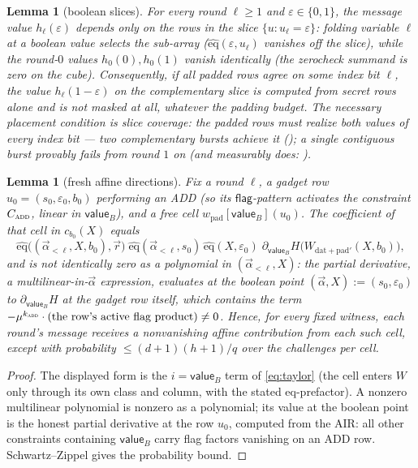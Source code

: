 \documentclass{article}
\newcommand{\eqf}{\widehat{\mathrm{eq}}}
\newcommand{\dat}{\mathrm{dat}}
\newcommand{\pad}{\mathrm{pad}}
\newtheorem{lemma}[theorem]{Lemma}
\theoremstyle{definition}
\begin{document}
\begin{lemma}[boolean slices]\label{lem:slices}
For every round $\ell \geq 1$ and $\varepsilon \in \{0,1\}$, the message value $h_\ell(\varepsilon)$ depends only on the rows in the slice $\{u : u_\ell = \varepsilon\}$: folding variable $\ell$ at a boolean value selects the sub-array ($\eqf(\varepsilon, u_\ell)$ vanishes off the slice), while the round-$0$ values $h_0(0), h_0(1)$ vanish identically (the zerocheck summand is zero on the cube). Consequently, if all padded rows agree on some index bit $\ell$, the value $h_\ell(1 - \varepsilon)$ on the complementary slice is computed from secret rows alone and is \emph{not masked at all}, whatever the padding budget. The necessary placement condition is \emph{slice coverage}: the padded rows must realize both values of every index bit --- two complementary bursts achieve it (); a single contiguous burst provably fails from round $1$ on (and measurably does: ).
\end{lemma}

\begin{lemma}[fresh affine directions]\label{lem:fresh}
Fix a round $\ell$, a gadget row $u_0 = (s_0, \varepsilon_0, b_0)$ performing an \textsc{ADD} (so its $\textsf{flag}$-pattern activates the constraint $C_{\textsc{add}}$, linear in $\textsf{value}_B$), and a free cell $w_{\pad}[\textsf{value}_B](u_0)$. The coefficient of that cell in $c_{b_0}(X)$ equals
\[
\eqf\big((\vec\alpha_{<\ell}, X, b_0), \vec r\big)\; \eqf(\vec\alpha_{<\ell}, s_0)\, \eqf(X, \varepsilon_0)\; \partial_{\textsf{value}_B} H\big(W_{\dat + \pad'}(X, b_0)\big) ,
\]
and is not identically zero as a polynomial in $(\vec\alpha_{<\ell}, X)$: the partial derivative, a multilinear-in-$\vec\alpha$ expression, evaluates at the boolean point $(\vec\alpha, X) := (s_0, \varepsilon_0)$ to $\partial_{\textsf{value}_B} H$ at the gadget row itself, which contains the term $-\mu^{k_{\textsc{add}}} \cdot (\text{the row's active flag product}) \neq 0$. Hence, for every fixed witness, each round's message receives a nonvanishing affine contribution from each such cell, except with probability $\leq (d+1)(h + 1)/q$ over the challenges per cell.
\end{lemma}

\begin{proof}
The displayed form is the $i = \textsf{value}_B$ term of \cref{eq:taylor} (the cell enters $W$ only through its own class and column, with the stated eq-prefactor). A nonzero multilinear polynomial is nonzero as a polynomial; its value at the boolean point is the honest partial derivative at the row $u_0$, computed from the AIR: all other constraints containing $\textsf{value}_B$ carry flag factors vanishing on an \textsc{ADD} row. Schwartz--Zippel gives the probability bound.
\end{proof}
\end{document}
